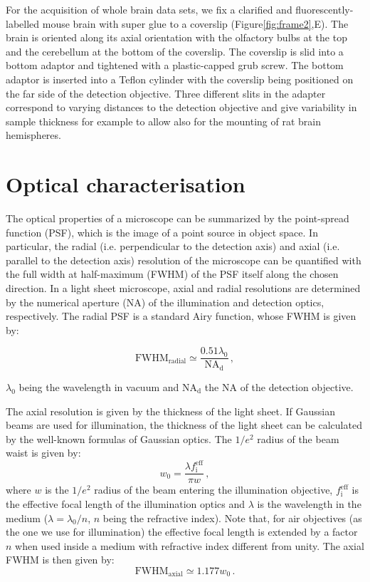 \documentclass[12pt]{spieman}  %
\begin{document}
For the acquisition of whole brain data sets, we fix a clarified and fluorescently-labelled mouse brain with super glue to a coverslip (Figure\ref{fig:frame2},E). The brain is oriented along its axial orientation with the olfactory bulbs at the top and the cerebellum at the bottom of the coverslip. The coverslip is slid into a bottom adaptor and tightened with a plastic-capped grub screw. The bottom adaptor is inserted into a Teflon cylinder with the coverslip being positioned on the far side of the detection objective. Three different slits in the adapter correspond to varying distances to the detection objective and give variability in sample thickness for example to allow also for the mounting of rat brain hemispheres.
	
\section{Optical characterisation}

The optical properties of a microscope can be summarized by the point-spread function (PSF), which is the image of a point source in object space. In particular, the radial (i.e. perpendicular to the detection axis) and axial (i.e. parallel to the detection axis) resolution of the microscope can be quantified with the full width at half-maximum (FWHM) of the PSF itself along the chosen direction. In a light sheet microscope, axial and radial resolutions are determined by the numerical aperture (NA) of the illumination and detection optics, respectively. The radial PSF is a standard Airy function, whose FWHM is given by:

\begin{equation}
\text{FWHM}_{\text{radial}} \simeq \frac{0.51 \lambda_0}{\text{NA}_{\text{d}}} \, ,
\end{equation}

$\lambda_0$ being the wavelength in vacuum and $\text{NA}_{\text{d}}$ the NA of the detection objective. 

The axial resolution is given by the thickness of the light sheet. If Gaussian beams are used for illumination, the thickness of the light sheet can be calculated by the well-known formulas of Gaussian optics\cite{Teich}. The $1/e^2$ radius of the beam waist is given by:
\begin{equation}
w_0 = \frac{\lambda f_{\text{i}}^{\text{eff}}}{\pi w} \, ,
\end{equation}
where $w$ is the $1/e^2$ radius of the beam entering the illumination objective, $ f_{\text{i}}^{\text{eff}}$ is the effective focal length of the illumination optics and $\lambda$ is the wavelength in the medium ($\lambda = \lambda_0 / n$, $n$ being the refractive index). Note that, for air objectives (as the one we use for illumination) the effective focal length is extended by a factor $n$ when used inside a medium with refractive index different from unity\cite{Silvestri2012}.
The axial FWHM is then given by:
\begin{equation}
\text{FWHM}_{\text{axial}} \simeq 1.177 w_0 \, .
\end{equation}
\end{document}
